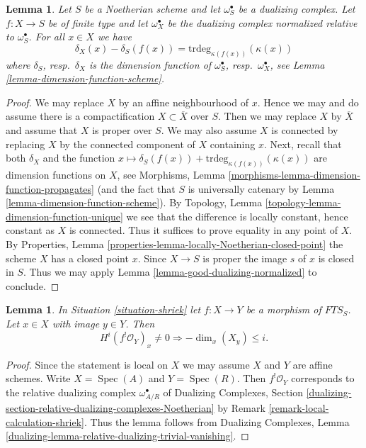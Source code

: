 \documentclass{stacks-project}
\theoremstyle{plain}
\newtheorem{lemma}[subsection]{Lemma}
\theoremstyle{definition}
\theoremstyle{remark}
\numberwithin{equation}{subsection}
\def\Spec{\mathop{\mathrm{Spec}}}
\begin{document}
\begin{lemma}
\label{lemma-good-dualizing-dimension-function}
Let $S$ be a Noetherian scheme and let $\omega_S^\bullet$ be a
dualizing complex. Let $f : X \to S$ be of finite type
and let $\omega_X^\bullet$ be the dualizing complex
normalized relative to $\omega_S^\bullet$. For all $x \in X$ we have
$$
\delta_X(x) - \delta_S(f(x)) = \text{trdeg}_{\kappa(f(x))}(\kappa(x))
$$
where $\delta_S$, resp.\ $\delta_X$
is the dimension function of
$\omega_S^\bullet$, resp.\ $\omega_X^\bullet$, see
Lemma \ref{lemma-dimension-function-scheme}.
\end{lemma}

\begin{proof}
We may replace $X$ by an affine neighbourhood of $x$. Hence we may
and do assume there is a compactification $X \subset \overline{X}$
over $S$. Then we may replace $X$ by $\overline{X}$ and assume
that $X$ is proper over $S$. We may also assume $X$ is connected
by replacing $X$ by the connected component of $X$ containing $x$.
Next, recall that both $\delta_X$ and the function
$x \mapsto \delta_S(f(x)) + \text{trdeg}_{\kappa(f(x))}(\kappa(x))$
are dimension functions on $X$, see
Morphisms, Lemma \ref{morphisms-lemma-dimension-function-propagates}
(and the fact that $S$ is universally catenary by
Lemma \ref{lemma-dimension-function-scheme}).
By Topology, Lemma \ref{topology-lemma-dimension-function-unique}
we see that the difference is locally constant, hence constant as $X$ is
connected. Thus it suffices to prove equality in any point of $X$.
By Properties, Lemma \ref{properties-lemma-locally-Noetherian-closed-point}
the scheme $X$ has a closed point $x$. Since $X \to S$ is proper
the image $s$ of $x$ is closed in $S$. Thus we may apply
Lemma \ref{lemma-good-dualizing-normalized} to conclude.
\end{proof}

\begin{lemma}
\label{lemma-shriek}
In Situation \ref{situation-shriek} let $f : X \to Y$ be a morphism of
$\textit{FTS}_S$. Let $x \in X$ with image $y \in Y$. Then
$$
H^i(f^!\mathcal{O}_Y)_x \not = 0
\Rightarrow - \dim_x(X_y) \leq i.
$$
\end{lemma}

\begin{proof}
Since the statement is local on $X$ we may assume $X$
and $Y$ are affine schemes. Write
$X = \Spec(A)$ and $Y = \Spec(R)$.
Then $f^!\mathcal{O}_Y$ corresponds to the relative dualizing
complex $\omega_{A/R}^\bullet$ of
Dualizing Complexes, Section
\ref{dualizing-section-relative-dualizing-complexes-Noetherian}
by Remark \ref{remark-local-calculation-shriek}.
Thus the lemma follows from Dualizing Complexes, Lemma
\ref{dualizing-lemma-relative-dualizing-trivial-vanishing}.
\end{proof}
\end{document}

